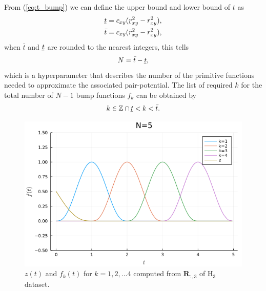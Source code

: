 \documentclass[12pt]{article}
\newcommand{\ubar}[1]{\underaccent{\bar}{#1}}
\begin{document}
From (\ref{eq:t_bump}) we can define the upper bound and lower bound of $t$ as
\begin{equation}
    \begin{split}
        \ubar{t} = c_{xy}(\ubar{r}_{xy}^2 - r^2_{xy}), \\
        \bar{t} = c_{xy}(\bar{r}_{xy}^2 - r^2_{xy}),
    \end{split}
    \label{eq:t_bounds}
\end{equation}
when $\bar{t}$ and $\ubar{t}$ are rounded to the nearest integers, this tells
\begin{equation}
    N = \bar{t} - \ubar{t},
    \label{eq:t_N}
\end{equation}
which is a hyperparameter that describes the number of the primitive functions needed to approximate the associated pair-potential. The list of required $k$ for the total number of $N-1$ bump functions $f_k$ can be obtained by
\begin{equation}
    k \in \mathbb{Z} \cap \ubar{t} < k <\bar{t}.
\end{equation}
\begin{figure}[H]
    \centering
    \includegraphics[scale=0.7]{img/zb(5).png}
    \caption{$z(t)$ and $f_k(t)$ for $k=1,2,...4$ computed from $\mathbf{R}_{:,3}$ of H$_3$ dataset.}
    \label{fig:zb(5)}
\end{figure}
\end{document}
